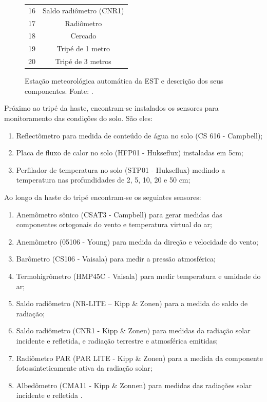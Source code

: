 \begin{figure}
\begin{minipage}{\textwidth}
\begin{minipage}[b]{0.39\textwidth}
\begin{footnotesize}
\begin{tabular}{cc}
		16 & Saldo radiômetro (CNR1)\\
		17 & Radiômetro\\
		18 & Cercado \\
		19 & Tripé de 1 metro \\
		20 & Tripé de 3 metros\\
		\bottomrule
		\end{tabular}
	\end{footnotesize}
    \end{minipage}
  \end{minipage}
	\caption{Estação meteorológica automática da EST e descrição dos seus componentes. Fonte: \cite{Labinstru:EST}.}\label{fig:ema}
\end{figure}

Próximo ao tripé da haste, encontram-se instalados os sensores para monitoramento das condições do solo. São eles:
\begin{enumerate}
	\item Reflectômetro para medida de conteúdo de água no solo (CS 616 - Campbell);
	\item Placa de fluxo de calor no solo (HFP01 - Hukseflux) instaladas em 5cm;
	\item Perfilador de temperatura no solo (STP01 - Hukseflux) medindo a temperatura nas profundidades de 2, 5,   10, 20 e 50 cm;
\end{enumerate}

Ao longo da haste do tripé encontram-se os seguintes sensores:
\begin{enumerate}
	\item Anemômetro sônico (CSAT3 - Campbell) para gerar medidas das componentes ortogonais do vento e temperatura virtual do ar;
	\item Anemômetro (05106 - Young) para medida da direção e velocidade do vento;
	\item Barômetro (CS106 - Vaisala) para medir a pressão atmosférica;
	\item Termohigrômetro (HMP45C - Vaisala) para medir temperatura e umidade do ar;
	\item Saldo radiômetro (NR-LITE – Kipp \& Zonen) para a medida do saldo de radiação;
	\item Saldo radiômetro (CNR1 - Kipp \& Zonen) para medidas da radiação solar incidente e refletida, e radiação terrestre e atmosférica emitidas;
	\item Radiômetro PAR (PAR LITE - Kipp \& Zonen) para a medida da componente fotossinteticamente ativa da radiação solar;
	\item Albedômetro (CMA11 - Kipp \& Zonnen) para medidas das radiações solar incidente e refletida \cite{Labinstru:EST}.
\end{enumerate}

